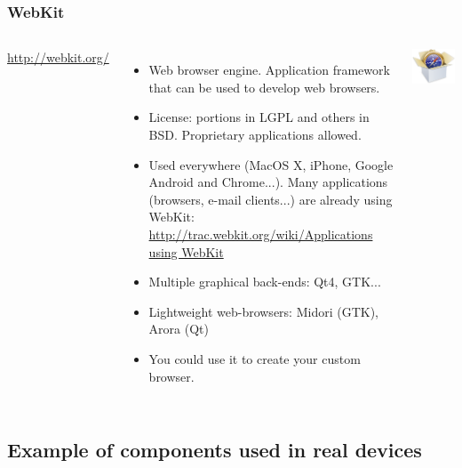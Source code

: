 \begin{frame}
  \frametitle{WebKit}
  \begin{columns}[T]
    \url{http://webkit.org/}
    \begin{itemize}
    \item Web browser engine. Application framework that can be used
      to develop web browsers.
    \item License: portions in LGPL and others in BSD. Proprietary
      applications allowed.
    \item Used everywhere (MacOS X, iPhone, Google Android and
      Chrome...). Many applications (browsers, e-mail clients...) are
      already using WebKit:
      \url{http://trac.webkit.org/wiki/Applications using WebKit}
    \item Multiple graphical back-ends: Qt4, GTK...
    \item Lightweight web-browsers: Midori (GTK), Arora (Qt)
    \item You could use it to create your custom browser.
    \end{itemize}
    \includegraphics[width=\textwidth]{slides/sysdev-embedded-linux/webkit.png}
  \end{columns}
\end{frame}

\subsection{Example of components used in real devices}

